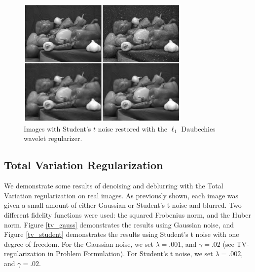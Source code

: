 \documentclass[10pt,a4paper]{article}
\begin{document}
	\begin{figure}[H]
		\begin{center}
			\includegraphics[width = 0.75\textwidth]{../figures/waveletStudentD.pdf} 
		\end{center}
		\caption{Images with Student's $t$ noise restored with the $\ell_1$ Daubechies wavelet regularizer.}
		\label{waveletD_student}
	\end{figure}
	
	\subsection{Total Variation Regularization}
	
	We demonstrate some results of denoising and deblurring with the Total Variation regularization on real images. As previously shown, each image was given a small amount of either Gaussian or Student's t noise and blurred. Two different fidelity functions were used: the squared Frobenius norm, and the Huber norm. Figure \ref{tv_gauss} demonstrates the results using Gaussian noise, and Figure \ref{tv_student} demonstrates the results using Student's t noise with one degree of freedom. For the Gaussian noise, we set $\lambda = .001$, and $\gamma = .02$ (see TV-regularization in Problem Formulation). For Student's t noise, we set $\lambda = .002$, and $\gamma = .02$.
	
\end{document}
